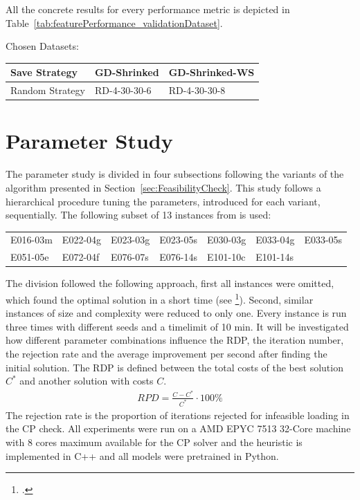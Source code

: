 All the concrete results for every performance metric is depicted in Table~\ref{tab:featurePerformance_validationDataset}.

Chosen Datasets:

\begin{table}[ht]
    \centering
    \setlength{\tabcolsep}{0.75em}
    \def\arraystretch{1.5}
    \begin{tabular}{l|ll}
        Save Strategy   & GD-Shrinked  & GD-Shrinked-WS \\\hline
        Random Strategy & RD-4-30-30-6 & RD-4-30-30-8   \\
    \end{tabular}
\end{table}

\section{Parameter Study}
\label{sec:parameter_study}

The parameter study is divided in four subsections following the variants of the algorithm
presented in Section~\ref{sec:FeasibilityCheck}. This study follows a hierarchical procedure
tuning the parameters, introduced for each variant, sequentially. The following subset of 13
instances from \gendreauDataSetText is used:


\begin{table}[ht]
    \centering
    \setlength{\tabcolsep}{0.75em}
    \def\arraystretch{1.5}
    \begin{tabular}{lllllll}
        E016-03m & E022-04g & E023-03g & E023-05s & E030-03g & E033-04g & E033-05s \\
        E051-05e & E072-04f & E076-07s & E076-14s & E101-10c & E101-14s &          \\
    \end{tabular}
\end{table}

The division followed the following approach, first all instances were omitted, which found
the optimal solution in a short time (see \cite{tamke_branch-and-cut_2024}\footcite[cf.][p.26]{tamke_branch-and-cut_2024}).
Second, similar instances of size and complexity were reduced to only one.
Every instance is run three times with different seeds and a timelimit of 10 min. It will be investigated
how different parameter combinations influence the \gls{RDP}, the iteration number, the rejection rate and
the average improvement per second after finding the initial solution. The \gls{RDP} is defined between the
total costs of the best solution $C^*$ and another solution with costs $C$.
\begin{align}
    RPD = \frac{C - C^*}{C^*} \cdot 100\%
\end{align}
The rejection rate is the proportion of iterations rejected for infeasible loading in the CP check.
All experiments were run on a AMD EPYC 7513 32-Core machine with 8 cores maximum available for the \gls{CP} solver
and the heuristic is implemented in C++ and all models were pretrained in Python.

